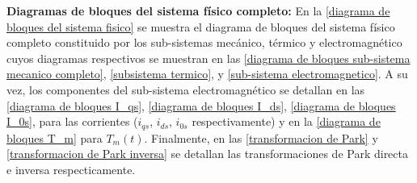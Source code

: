 \documentclass[a4paper, 10pt, onecolumn,journal]{ieeeconf}
\begin{document}
\textbf{Diagramas de bloques del sistema físico completo: } En la \cref{diagrama de bloques del sistema fisico} se muestra
el diagrama de bloques del sistema físico completo constituido por los sub-sistemas mecánico, térmico y electromagnético cuyos diagramas
respectivos se muestran en las \cref{diagrama de bloques sub-sistema mecanico completo}, \cref{subsistema termico},
y \cref{sub-sistema electromagnetico}. A su vez, los componentes del sub-sistema electromagnético se detallan
en las \cref{diagrama de bloques I_qs}, \cref{diagrama de bloques I_ds}, \cref{diagrama de bloques I_0s}, para las corrientes ($i_{qs}$, $i_{ds}$, $i_{0s}$ respectivamente) y en la \cref{diagrama de bloques T_m} para $T_m(t)$.
Finalmente, en las \cref{transformacion de Park} y \cref{transformacion de Park inversa} se detallan las transformaciones de Park directa e inversa respecticamente.
\end{document}
